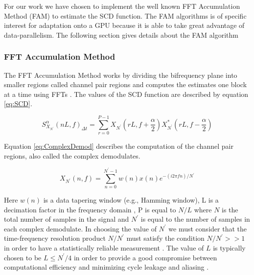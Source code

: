 For our work we have chosen to implement the well known FFT Accumulation Method (FAM) to estimate the SCD function.  The FAM algorithms is of specific interest for adaptation onto a GPU because it is able to take great advantage of data-parallelism.  The following section gives details about the FAM algorithm

\subsubsection{FFT Accumulation Method}
\label{sect:FAM}
The FFT Accumulation Method works by dividing the bifrequency plane into smaller regions called channel pair regions and computes the estimates one block at a time using FFTs \cite{Pace03}.  The values of the SCD function are described by equation \ref{eq:SCD}.

\begin{equation}
S^{\alpha}_{X_{N^\prime}} {(n L, f)}_{\Delta t} = \sum_{r=0}^{P-1} X_{N^\prime}(r L,f + \frac{\alpha}{2}) X_{N^\prime}^*(r L, f - \frac{\alpha}{2})
\label{eq:SCD}
\end{equation}

Equation \ref{eq:ComplexDemod} describes the computation of the channel pair regions, also called the complex demodulates.

\begin{equation}
X_{N^\prime}(n,f) = \sum_{n=0}^{N^\prime - 1} w(n) x(n) e^{-(i 2 \pi f n)/N^\prime}
\label{eq:ComplexDemod}
\end{equation}

Here \begin{math}w(n)\end{math} is a data tapering window (e.g., Hamming window), L is a decimation factor in the frequency domain \cite{FenChenWan08}, P is equal to \begin{math}N / L \end{math} where $N$ is the total number of samples in the signal and $N^\prime$ is equal to the number of samples in each complex demodulate.  In choosing the value of \begin{math}N^\prime \end{math} we must consider that the time-frequency resolution product \begin{math}N/N^\prime\end{math} must satisfy the condition \begin{math}N/N^\prime >> 1\end{math} in order to have a statistically reliable measurement \cite{RobBroLoo91}.  The value of $L$ is typically chosen to be \begin{math}L \le N^\prime / 4\end{math} in order to provide a good compromise between computational efficiency and minimizing cycle leakage and aliasing \cite{RobBroLoo91}.

